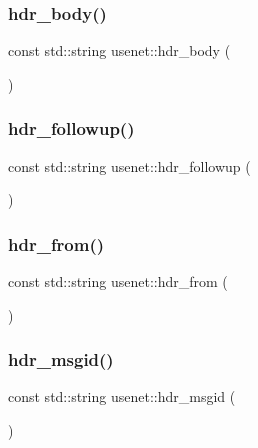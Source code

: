 \hypertarget{namespaceusenet_a52e0201d594d80ec55e7880e1c117830}{}\label{namespaceusenet_a52e0201d594d80ec55e7880e1c117830} 
\subsubsection{\texorpdfstring{hdr\+\_\+body()}{hdr\_body()}}
{\footnotesize\ttfamily const std\+::string usenet\+::hdr\+\_\+body (\begin{DoxyParamCaption}\item[{\char`\"{}Body\+:\char`\"{}}]{ }\end{DoxyParamCaption})}

\hypertarget{namespaceusenet_a8694574881407155e03162c163b5c99f}{}\label{namespaceusenet_a8694574881407155e03162c163b5c99f} 
\subsubsection{\texorpdfstring{hdr\+\_\+followup()}{hdr\_followup()}}
{\footnotesize\ttfamily const std\+::string usenet\+::hdr\+\_\+followup (\begin{DoxyParamCaption}\item[{\char`\"{}Followup-\/To\+: \char`\"{}}]{ }\end{DoxyParamCaption})}

\hypertarget{namespaceusenet_a83de6af786c35f4d5b783fddbe72172d}{}\label{namespaceusenet_a83de6af786c35f4d5b783fddbe72172d} 
\subsubsection{\texorpdfstring{hdr\+\_\+from()}{hdr\_from()}}
{\footnotesize\ttfamily const std\+::string usenet\+::hdr\+\_\+from (\begin{DoxyParamCaption}\item[{\char`\"{}From\+: \char`\"{}}]{ }\end{DoxyParamCaption})}

\hypertarget{namespaceusenet_aca25673417ef48d5c9deb89b8efa4989}{}\label{namespaceusenet_aca25673417ef48d5c9deb89b8efa4989} 
\subsubsection{\texorpdfstring{hdr\+\_\+msgid()}{hdr\_msgid()}}
{\footnotesize\ttfamily const std\+::string usenet\+::hdr\+\_\+msgid (\begin{DoxyParamCaption}\item[{\char`\"{}Message-\/I\+D\+: \char`\"{}}]{ }\end{DoxyParamCaption})}

